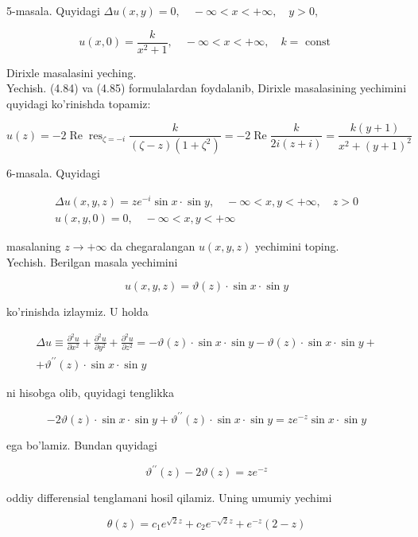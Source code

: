 \documentclass[10pt]{article}
\begin{document}
5-masala. Quyidagi $\Delta u(x, y)=0, \quad-\infty<x<+\infty, \quad y>0$,

$$
u(x, 0)=\frac{k}{x^{2}+1}, \quad-\infty<x<+\infty, \quad k=\text { const }
$$

Dirixle masalasini yeching.\\
Yechish. (4.84) va (4.85) formulalardan foydalanib, Dirixle masalasining yechimini quyidagi ko'rinishda topamiz:

$$
u(z)=-2 \operatorname{Re} \operatorname{res}_{\zeta=-i} \frac{k}{(\zeta-z)\left(1+\zeta^{2}\right)}=-2 \operatorname{Re} \frac{k}{2 i(z+i)}=\frac{k(y+1)}{x^{2}+(y+1)^{2}}
$$

6-masala. Quyidagi

$$
\begin{gathered}
\Delta u(x, y, z)=z e^{-i} \sin x \cdot \sin y, \quad-\infty<x, y<+\infty, \quad z>0 \\
u(x, y, 0)=0, \quad-\infty<x, y<+\infty
\end{gathered}
$$

masalaning $z \rightarrow+\infty$ da chegaralangan $u(x, y, z)$ yechimini toping.\\
Yechish. Berilgan masala yechimini

$$
u(x, y, z)=\vartheta(z) \cdot \sin x \cdot \sin y
$$

ko'rinishda izlaymiz. U holda

$$
\begin{gathered}
\Delta u \equiv \frac{\partial^{2} u}{\partial x^{2}}+\frac{\partial^{2} u}{\partial y^{2}}+\frac{\partial^{2} u}{\partial z^{2}}=-\vartheta(z) \cdot \sin x \cdot \sin y-\vartheta(z) \cdot \sin x \cdot \sin y+ \\
+\vartheta^{\prime \prime}(z) \cdot \sin x \cdot \sin y
\end{gathered}
$$

ni hisobga olib, quyidagi tenglikka

$$
-2 \vartheta(z) \cdot \sin x \cdot \sin y+\vartheta^{\prime \prime}(z) \cdot \sin x \cdot \sin y=z e^{-z} \sin x \cdot \sin y
$$

ega bo'lamiz. Bundan quyidagi

$$
\vartheta^{\prime \prime}(z)-2 \vartheta(z)=z e^{-z}
$$

oddiy differensial tenglamani hosil qilamiz. Uning umumiy yechimi


\begin{equation*}
\theta(z)=c_{1} e^{\sqrt{2} z}+c_{2} e^{-\sqrt{2} z}+e^{-z}(2-z) \tag{4.86}
\end{equation*}
\end{document}
